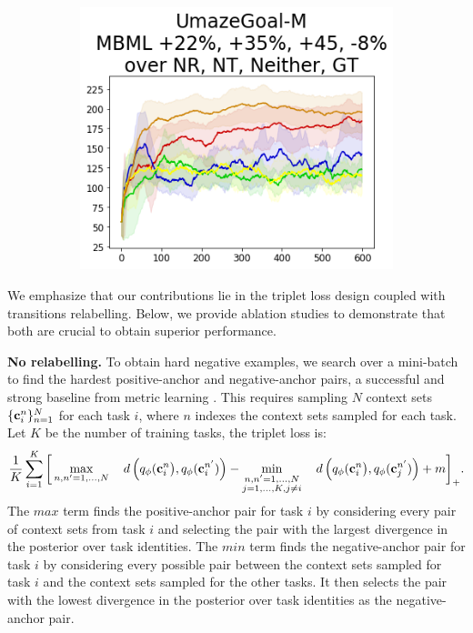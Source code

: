 \begin{figure}[!t]
\begin{minipage}{0.70\textwidth}
{            \begin{subfigure}{\mujocobaselinefigsize\paperwidth}
                \includegraphics[width=\linewidth]{chapter_2/fig/wd-ablation-UmazeGoal-M.png}
            \end{subfigure}}

    \end{minipage}

\end{figure}

We emphasize that our contributions lie in the triplet loss design coupled with transitions relabelling. Below, we provide ablation studies to demonstrate that both are crucial to obtain superior performance.

\textbf{No relabelling.} To obtain  hard negative examples, we search over a mini-batch to find the hardest positive-anchor and negative-anchor pairs, a successful and strong baseline from metric learning \cite{hermans2017defense}. This requires sampling $N$ context sets $\{{\bf c}^n_i\}_{n=1}^N$ for each task $i$, where $n$ indexes the context sets sampled for each task.
Let $K$ be the number of training tasks, the triplet loss is:
\begin{equation}\label{eq_reform_triplet}
    \frac{1}{K} \sum_{i=1 }^{K} \bigg[\max_{n,n'=1,\ldots, N} \quad d \left(q_{\phi}({\bf c}^n_{i}\big), q_{\phi} ({\bf c}^{n'}_{i}) \right)
    -  \min_{\substack{n,n'=1,\ldots, N \\ j=1,\ldots,K, j \neq i}} \quad d \left(q_{\phi}({\bf c}^n_{i}\big), q_{\phi} ({\bf c}^{n'}_{j}) \right) + m\bigg]_{+}.
\end{equation}
The $max$ term
finds the positive-anchor pair
for task $i$
by considering every pair of context sets from task $i$ and selecting the pair with the largest divergence in the posterior over task identities. The $min$ term
finds the negative-anchor pair
for task $i$
by considering every possible pair between the context sets sampled for task $i$ and the context sets sampled for the other tasks. It then selects the pair with the lowest divergence in the posterior over task identities
as the negative-anchor pair.

